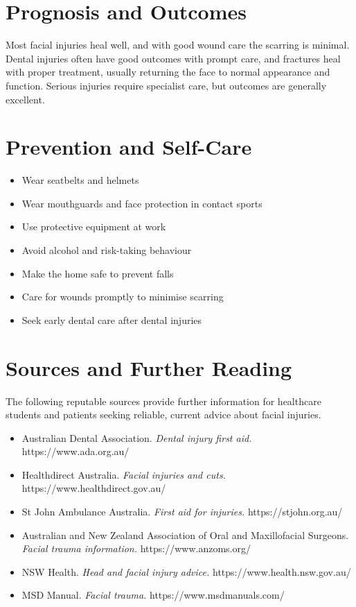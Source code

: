 \section*{Prognosis and Outcomes}
Most facial injuries heal well, and with good wound care the scarring is minimal. Dental injuries often have good outcomes with prompt care, and fractures heal with proper treatment, usually returning the face to normal appearance and function. Serious injuries require specialist care, but outcomes are generally excellent.

\section*{Prevention and Self-Care}
\begin{itemize}
    \item Wear seatbelts and helmets
    \item Wear mouthguards and face protection in contact sports
    \item Use protective equipment at work
    \item Avoid alcohol and risk-taking behaviour
    \item Make the home safe to prevent falls
    \item Care for wounds promptly to minimise scarring
    \item Seek early dental care after dental injuries
\end{itemize}

\section*{Sources and Further Reading}
The following reputable sources provide further information for healthcare students and patients seeking reliable, current advice about facial injuries.
\begin{itemize}
    \item Australian Dental Association. \textit{Dental injury first aid.} https://www.ada.org.au/
    \item Healthdirect Australia. \textit{Facial injuries and cuts.} https://www.healthdirect.gov.au/
    \item St John Ambulance Australia. \textit{First aid for injuries.} https://stjohn.org.au/
    \item Australian and New Zealand Association of Oral and Maxillofacial Surgeons. \textit{Facial trauma information.} https://www.anzoms.org/
    \item NSW Health. \textit{Head and facial injury advice.} https://www.health.nsw.gov.au/
    \item MSD Manual. \textit{Facial trauma.} https://www.msdmanuals.com/
\end{itemize}

